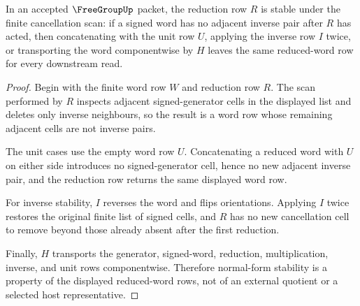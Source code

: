 \begin{theorem}
\label{thm:free-group-reduction-normal-form}
In an accepted $\FreeGroupUp$ packet, the reduction row $R$ is stable under the finite cancellation scan: if a signed word has no adjacent inverse pair after $R$ has acted, then concatenating with the unit row $U$, applying the inverse row $I$ twice, or transporting the word componentwise by $H$ leaves the same reduced-word row for every downstream read.
\end{theorem}
\begin{proof}
Begin with the finite word row $W$ and reduction row $R$. The scan performed by $R$ inspects adjacent signed-generator cells in the displayed list and deletes only inverse neighbours, so the result is a word row whose remaining adjacent cells are not inverse pairs.

The unit cases use the empty word row $U$. Concatenating a reduced word with $U$ on either side introduces no signed-generator cell, hence no new adjacent inverse pair, and the reduction row returns the same displayed word row.

For inverse stability, $I$ reverses the word and flips orientations. Applying $I$ twice restores the original finite list of signed cells, and $R$ has no new cancellation cell to remove beyond those already absent after the first reduction.

Finally, $H$ transports the generator, signed-word, reduction, multiplication, inverse, and unit rows componentwise. Therefore normal-form stability is a property of the displayed reduced-word rows, not of an external quotient or a selected host representative.
\end{proof}

